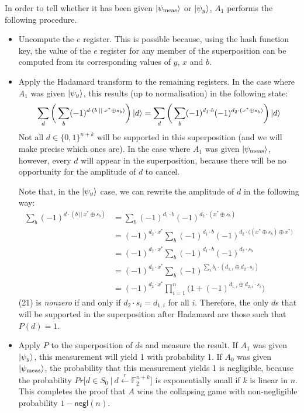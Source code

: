 \documentclass{article}
\begin{document}
In order to tell whether it has been given $\ket{\psi_{\mathrm{meas}}}$ or $\ket{\psi_y}$, $A_1$ performs the following procedure.
\begin{itemize}
    \item Uncompute the $e$ register. This is possible because, using the hash function key, the value of the $e$ register for any member of the superposition can be computed from its corresponding values of $y$, $x$ and $b$.
    \item Apply the Hadamard transform to the remaining registers. In the case where $A_1$ was given $\ket{\psi_y}$, this results (up to normalisation) in the following state:
    \begin{align}
        \sum_d \bigg( \sum_b (-1)^{d \cdot (b \: || \: x^* \oplus s_b)} \bigg) \ket{d} = \sum_d \bigg( \sum_b (-1)^{d_1 \cdot b} (-1)^{d_2 \cdot (x^* \oplus s_{b})} \bigg) \ket{d}
    \end{align}
    Not all $d \in \{0,1\}^{n + k}$ will be supported in this superposition (and we will make precise which ones are). In the case where $A_1$ was given $\ket{\psi_{\mathrm{meas}}}$, however, every $d$ will appear in the superposition, because there will be no opportunity for the amplitude of $d$ to cancel.
    
    Note that, in the $\ket{\psi_y}$ case, we can rewrite the amplitude of $d$ in the following way:
    \begin{align}
        \sum_b (-1)^{d \cdot (b \: || \: x^* \oplus s_b)} &=
			\sum_b (-1)^{d_1 \cdot b} (-1)^{d_2 \cdot (x^* \oplus s_{b})} \\
        &= (-1)^{d_2 \cdot x^*} \sum_b (-1)^{d_1 \cdot b} (-1)^{d_2 \cdot \big( (x^* \oplus s_b) \oplus x^* \big)} \\
			&= (-1)^{d_2 \cdot x^*} \sum_b (-1)^{d_1 \cdot b} (-1)^{d_2 \cdot s_b} \\
			&= (-1)^{d_2 \cdot x^*} \sum_b (-1)^{\sum_i b_i \cdot (d_{1, i} \oplus d_2 \cdot s_i)} \\
			&= (-1)^{d_2 \cdot x^*} \prod_{i = 1}^n \big( 1 + (-1)^{d_{1, i} \oplus d_{2, i} \cdot s_i} \big)
    \end{align}
(21) is \textit{nonzero} if and only if $d_2 \cdot s_i = d_{1, i}$ for all $i$. Therefore, the only $d$s that will be supported in the superposition after Hadamard are those such that $P(d) = 1$.

	\item Apply $P$ to the superposition of $d$s and measure the result. If $A_1$ was given $\ket{\psi_y}$, this measurement will yield 1 with probability 1. If $A_0$ was given $\ket{\psi_{\mathrm{meas}}}$, the probability that this measurement yields 1 is negligible, because the probability $Pr\Big[ d \in S_0 \: \Big| \: d \stackrel{r}{\leftarrow} \mathbb{F}_2^{n+k} \Big]$ is exponentially small if $k$ is linear in $n$. This completes the proof that $A$ wins the collapsing game with non-negligible probability $1 - \textsf{negl}(n)$.
\end{itemize}
\end{document}
